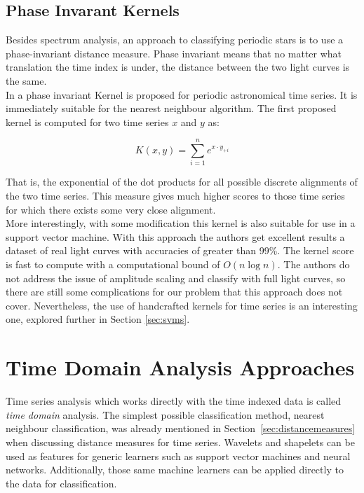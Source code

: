 	\subsection{Phase Invarant Kernels}
	Besides spectrum analysis, an approach to classifying periodic stars is to use a phase-invariant distance measure. Phase invariant means that no matter what translation the time index is under, the distance between the two light curves is the same.
	\\
	In \citep{wachman2009kernels} a phase invariant Kernel is proposed for periodic astronomical time series. It is immediately suitable for the nearest neighbour algorithm. The first proposed kernel is computed for two time series $x$ and $y$ as:
	\begin{center}
	\begin{equation*}
		K(x,y) = \sum\limits_{i=1}^{n}e^{ x \cdot y_{+i}}
	\end{equation*}
	\end{center}
	That is, the exponential of the dot products for all possible discrete alignments of the two time series. 	This measure gives much higher scores to those time series for which there exists some very close alignment.
	\\
	More interestingly, with some modification this kernel is also suitable for use in a support vector machine. With this approach the authors get excellent results a dataset of real light curves with accuracies of greater than 99\%. The kernel score is fast to compute with a computational bound of $O(n\log n)$. The authors do not address the issue of amplitude scaling and classify with full light curves, so there are still some complications for our problem that this approach does not cover. Nevertheless, the use of handcrafted kernels for time series is an interesting one, explored further in Section \ref{sec:svms}.
	
	\section{Time Domain Analysis Approaches}
	Time series analysis which works directly with the time indexed data is called \emph{time domain} analysis. The simplest possible classification method, nearest neighbour classification, was already mentioned in Section~\ref{sec:distancemeasures} when discussing distance measures for time series. Wavelets and shapelets can be used as features for generic learners such as support vector machines and neural networks. Additionally, those same machine learners can be applied directly to the data for classification.

